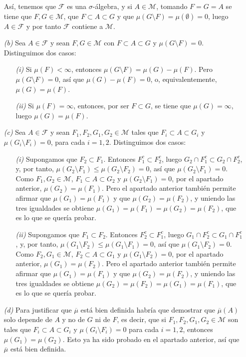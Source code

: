 \documentclass[11pt]{report}
\newcommand{\F}{\mathcal F}
\newcommand{\M}{\mathcal M}
\begin{document}
\begin{itemize}
\begin{itemize}
    \end{itemize}
    Así, tenemos que $\F$ es una $\sigma$-álgebra, y si $A \in \M$, tomando $F=G=A$ se tiene que $F,G \in \M$, que $F \subset A \subset G$ y que $\mu(G\setminus F)=\mu(\emptyset)=0$, luego $A \in \F$ y por tanto $\F$ contiene a $\M$.
    \item[\textit{(b)}] Sea $A \in \F$ y sean $F,G \in \M$ con $F \subset A \subset G$ y $\mu(G \setminus F) = 0$. Distinguimos dos casos:
    \begin{itemize}
        \item[\textit{(i)}] Si $\mu(F) < \infty$, entonces $\mu(G \setminus F) = \mu(G)-\mu(F)$. Pero $\mu(G \setminus F) = 0$, así que $\mu(G)-\mu(F)=0$, o, equivalentemente, $\mu(G)=\mu(F)$.
        \item[\textit{(ii)}] Si $\mu(F) = \infty$, entonces, por ser $F \subset G$, se tiene que $\mu(G) = \infty$, luego $\mu(G)=\mu(F)$.
    \end{itemize}
    \item[\textit{(c)}] Sea $A \in \F$ y sean $F_1,F_2,G_1,G_2 \in \M$ tales que $F_i \subset A \subset G_i$ y $\mu(G_i \setminus F_i)=0$, para cada $i = 1,2$. Distinguimos dos casos:
    \begin{itemize}
        \item[\textit{(i)}] Supongamos que $F_2 \subset F_1$. Entonces $F_1^c \subset F_2^c$, luego $G_2 \cap F_1^c \subset G_2 \cap F_2^c$, y, por tanto, $\mu(G_2 \setminus F_1) \leq \mu(G_2 \setminus F_2) = 0$, así que $\mu(G_2 \setminus F_1) = 0$. Como $F_1,G_2 \in \M$, $F_1 \subset A \subset G_2$ y $\mu(G_2 \setminus F_1) = 0$, por el apartado anterior, $\mu(G_2)=\mu(F_1)$. Pero el apartado anterior también permite afirmar que $\mu(G_1)=\mu(F_1)$ y que $\mu(G_2)=\mu(F_2)$, y uniendo las tres igualdades se obtiene
        $\mu(G_1)=\mu(F_1)=\mu(G_2)=\mu(F_2)$, que es lo que se quería probar.
        \item[\textit{(ii)}] Supongamos que $F_1 \subset F_2$. Entonces $F_2^c \subset F_1^c$, luego $G_1 \cap F_2^c \subset G_1 \cap F_1^c$, y, por tanto, $\mu(G_1 \setminus F_2) \leq \mu(G_1 \setminus F_1) = 0$, así que $\mu(G_1 \setminus F_2) = 0$. Como $F_2,G_1 \in \M$, $F_2 \subset A \subset G_1$ y $\mu(G_1 \setminus F_2) = 0$, por el apartado anterior, $\mu(G_1)=\mu(F_2)$. Pero el apartado anterior también permite afirmar que $\mu(G_1)=\mu(F_1)$ y que $\mu(G_2)=\mu(F_2)$, y uniendo las tres igualdades se obtiene
        $\mu(G_2)=\mu(F_2)=\mu(G_1)=\mu(F_1)$, que es lo que se quería probar.
    \end{itemize}
    \item[\textit{(d)}] Para justificar que $\overline{\mu}$ está bien definida habría que demostrar que $\overline{\mu}(A)$ solo depende de $A$ y no de $G$ ni de $F$, es decir, que si $F_1,F_2,G_1,G_2 \in \M$ son tales que $F_i \subset A \subset G_i$ y $\mu(G_i \setminus F_i)=0$ para cada $i = 1,2$, entonces $\mu(G_1)=\mu(G_2)$. Esto ya ha sido probado en el apartado anterior, así que $\overline{\mu}$ está bien definida.


\end{itemize}
\end{document}
